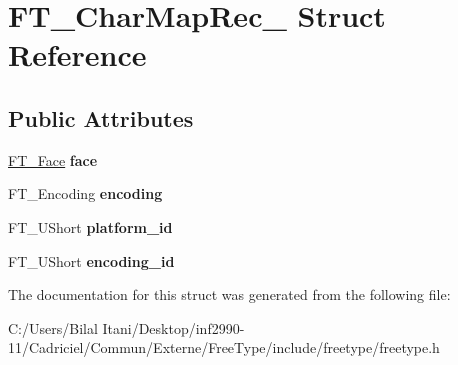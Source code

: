 \hypertarget{struct_f_t___char_map_rec__}{}\section{F\+T\+\_\+\+Char\+Map\+Rec\+\_\+ Struct Reference}
\label{struct_f_t___char_map_rec__}
\subsection*{Public Attributes}
\begin{DoxyCompactItemize}
\item 
\hyperlink{struct_f_t___face_rec__}{F\+T\+\_\+\+Face} {\bfseries face}\hypertarget{struct_f_t___char_map_rec___a70a4e53e3f9818209916e5745c46dc28}{}\label{struct_f_t___char_map_rec___a70a4e53e3f9818209916e5745c46dc28}

\item 
F\+T\+\_\+\+Encoding {\bfseries encoding}\hypertarget{struct_f_t___char_map_rec___a88ee6f726ef11a8e6cc793d59ff5557e}{}\label{struct_f_t___char_map_rec___a88ee6f726ef11a8e6cc793d59ff5557e}

\item 
F\+T\+\_\+\+U\+Short {\bfseries platform\+\_\+id}\hypertarget{struct_f_t___char_map_rec___ae7f439996a8615698e780ce3c4f92457}{}\label{struct_f_t___char_map_rec___ae7f439996a8615698e780ce3c4f92457}

\item 
F\+T\+\_\+\+U\+Short {\bfseries encoding\+\_\+id}\hypertarget{struct_f_t___char_map_rec___af10dd43eee8dc93e7d6191c663ae831a}{}\label{struct_f_t___char_map_rec___af10dd43eee8dc93e7d6191c663ae831a}

\end{DoxyCompactItemize}


The documentation for this struct was generated from the following file\+:\begin{DoxyCompactItemize}
\item 
C\+:/\+Users/\+Bilal Itani/\+Desktop/inf2990-\/11/\+Cadriciel/\+Commun/\+Externe/\+Free\+Type/include/freetype/freetype.\+h\end{DoxyCompactItemize}
